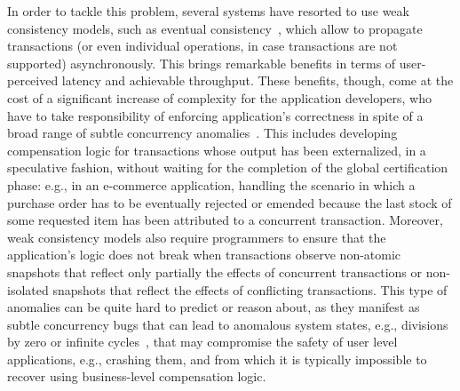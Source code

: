 In order to tackle this problem, several systems have resorted to use weak consistency models, such as eventual consistency~\cite{kawell1988replicated, lloyd2011don, cure}, which allow to propagate transactions (or even individual operations, in case transactions are not supported) asynchronously. This brings remarkable benefits in terms of user-perceived latency and achievable throughput. These benefits, though, come at the cost of a significant increase of complexity for the application developers, who have to take responsibility of enforcing application's correctness in spite of a broad range of subtle concurrency anomalies~\cite{shute2012f1}. This includes developing compensation logic for transactions whose output has been externalized, in a speculative fashion, without waiting for the completion of the global certification phase: e.g., in an e-commerce application, handling the scenario in which a purchase order has to be eventually rejected or emended because the last stock of some requested item has been attributed to a concurrent transaction. Moreover, weak consistency models also require programmers to ensure that the application's logic does not break when transactions observe non-atomic snapshots that reflect only partially the effects of concurrent transactions or non-isolated snapshots that reflect the effects of conflicting transactions. This type of anomalies can be quite hard to predict or reason about, as they manifest as subtle concurrency bugs that can lead to anomalous system states, e.g., divisions by zero or infinite cycles~\cite{guerraoui2007opacity}, that may compromise the safety of user level applications, e.g., crashing them, and from which it is typically impossible to recover using business-level compensation logic.

